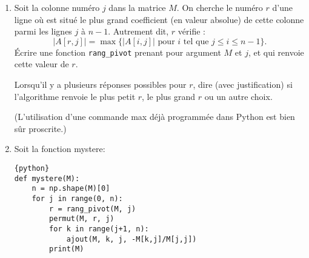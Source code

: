 \documentclass[a4paper, 11pt,reqno]{article}
\begin{document}
\begin{exercice} 
\begin{enumerate}
\begin{enumerate}
\item Que réalise la fonction multip?
\begin{lstlisting}{python}
def multip(M, i, c):
    p = np.shape(M)[1]
    for k in range(0, p):
        M[i,k] = c*M[i,k]
\end{lstlisting}


\item Compléter la fonction ajout, afin qu'elle effectue l'opération $L_{i} \leftarrow L_{i}+c L_{j}$.
\begin{lstlisting}{python}
def ajout(M, i, j, c):
    p = np.shape(M)[1]
    for k in range(0, p):
        _____ ligne(s) a completer _____ 
\end{lstlisting}

\item Écrire une fonction permut prenant pour argument $M, i$ et $j$, et qui modifie $M$ en échangeant les valeurs des lignes $i$ et $j$.
\end{enumerate}
Dans la suite du sujet, l'expression "opération élémentaire sur les lignes" fera référence à l'utilisation de permut, multip ou ajout.
\item  Soit la colonne numéro $j$ dans la matrice $M$. On cherche le numéro $r$ d'une ligne où est situé le plus grand coefficient (en valeur absolue) de cette colonne parmi les lignes $j$ à $n-1$. Autrement dit, $r$ vérifie :
$$
|A[r, j]|=\max \{|A[i, j]| \text { pour } i \text { tel que } j \leq i \leq n-1\} .
$$
Écrire une fonction \texttt{rang\_pivot} prenant pour argument $M$ et $j$, et qui renvoie cette valeur de $r$.

 Lorsqu'il y a plusieurs réponses possibles pour $r$, dire (avec justification) si l'algorithme renvoie le plus petit $r$, le plus grand $r$ ou un autre choix.
 
  (L'utilisation d'une commande max déjà programmée dans Python est bien sûr proscrite.)
  
\item Soit la fonction mystere:
\begin{lstlisting}{python}
def mystere(M):
    n = np.shape(M)[0]
    for j in range(0, n):
        r = rang_pivot(M, j)
        permut(M, r, j)
        for k in range(j+1, n):
            ajout(M, k, j, -M[k,j]/M[j,j])
        print(M) 
\end{lstlisting} 


\end{enumerate}
\end{exercice}
\end{document}
